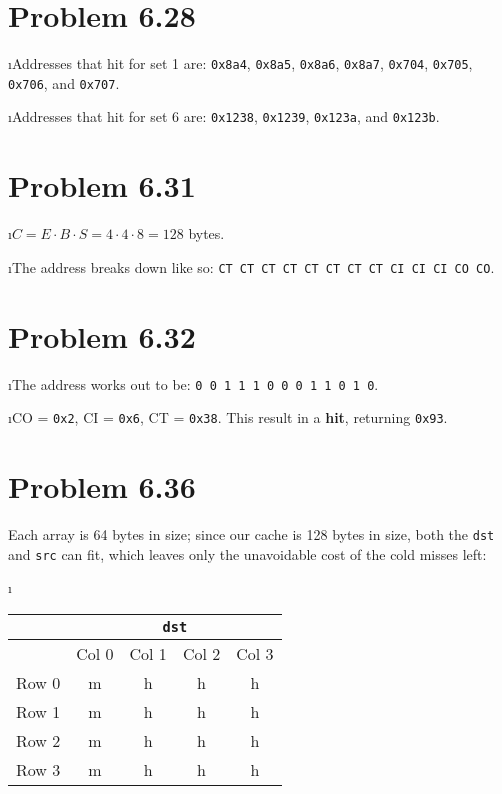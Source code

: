 \documentclass[fleqn]{article}
\begin{document}


\section{Problem 6.28}

\bee
\i Addresses that hit for set 1 are: \texttt{0x8a4}, \texttt{0x8a5}, \texttt{0x8a6}, \texttt{0x8a7}, \texttt{0x704}, \texttt{0x705}, \texttt{0x706}, and \texttt{0x707}.

\i Addresses that hit for set 6 are: \texttt{0x1238}, \texttt{0x1239}, \texttt{0x123a}, and \texttt{0x123b}.

\ene

\section{Problem 6.31}

\bee

\i $C = E \cdot B \cdot S = 4 \cdot 4 \cdot 8 = 128$ bytes.

\i The address breaks down like so: \texttt{CT CT CT CT CT CT CT CT  CI CI CI  CO CO}.

\ene

\section{Problem 6.32}

\bee

\i The address works out to be: \texttt{0 0 1 1 1 0 0 0 1 1 0 1 0}.

\i CO = \texttt{0x2}, CI = \texttt{0x6}, CT = \texttt{0x38}. This result in a \textbf{hit}, returning \texttt{0x93}.

\ene

\section{Problem 6.36}

Each array is 64 bytes in size; since our cache is 128 bytes in size, both the \texttt{dst} and \texttt{src} can fit, which leaves only the unavoidable cost of the cold misses left:

\bee

\i \begin{tabular}{ c|c|c|c|c| }
  & \multicolumn{4}{|c|}{\texttt{dst}} \\
  \hline
  & Col 0 & Col 1 & Col 2 & Col 3 \\
  \hline
  Row 0 & m & h & h & h \\
  \hline
  Row 1 & m & h & h & h \\
  \hline
  Row 2 & m & h & h & h \\
  \hline
  Row 3 & m & h & h & h \\
  \hline
\end{tabular}
\end{document}
